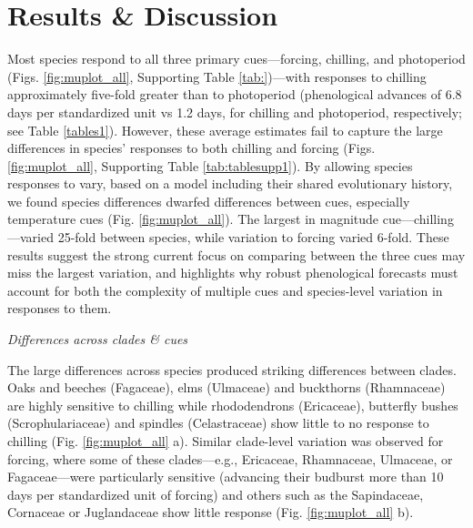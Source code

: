 \documentclass[11pt]{article}
\begin{document}
\section*{Results \& Discussion}

Most species respond to all three primary cues---forcing, chilling, and photoperiod (Figs. \ref{fig:muplot_all}, Supporting Table \ref{tab:})\citep[see also][]{Laube:2014a,ettinger2020}---with responses to chilling approximately five-fold greater than to photoperiod (phenological advances of 6.8 days per standardized unit vs 1.2 days, for chilling and photoperiod, respectively; see Table \ref{tables1}). However, these average estimates fail to capture the large differences in species' responses to both chilling and forcing (Figs. \ref{fig:muplot_all}, Supporting Table \ref{tab:tablesupp1}). By allowing species responses to vary, based on a model including their shared evolutionary history, we found species differences dwarfed differences between cues, especially temperature cues (Fig. \ref{fig:muplot_all}). The largest in magnitude cue---chilling---varied 25-fold between species, while variation to forcing varied 6-fold. These results suggest the strong current focus on comparing between the three cues may miss the largest variation, and highlights why robust phenological forecasts must account for both the complexity of multiple cues and species-level variation in responses to them. %

\emph{Differences across clades \& cues}

The large differences across species produced striking differences between clades. Oaks and beeches (Fagaceae), elms (Ulmaceae) and buckthorns (Rhamnaceae) are highly sensitive to chilling while rhododendrons (Ericaceae), butterfly bushes (Scrophulariaceae) and spindles (Celastraceae) show little to no response to chilling (Fig. \ref{fig:muplot_all} a). %
Similar clade-level variation was observed for forcing, where some of these clades---e.g., Ericaceae, Rhamnaceae, Ulmaceae, or Fagaceae---were particularly sensitive (advancing their budburst more than 10 days per standardized unit of forcing) and others such as the Sapindaceae, Cornaceae or Juglandaceae show little response (Fig. \ref{fig:muplot_all} b). %
\end{document}
